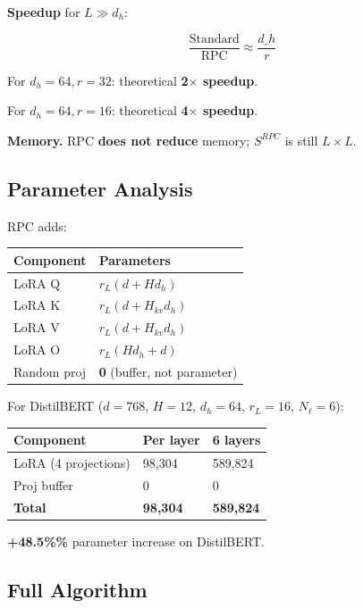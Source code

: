 \textbf{Speedup} for $L \gg d_h$:

\[
\frac{\text{Standard}}{\text{RPC}} \approx \frac{d\_h}{r}
\tag{4.6}
\]

For $d_h = 64, r = 32$: theoretical \textbf{2$\times$ speedup}.

For $d_h = 64, r = 16$: theoretical \textbf{4$\times$ speedup}.

\textbf{Memory.} RPC \textbf{does not reduce} memory; $S^{RPC}$ is still $L \times L$.

\subsection{Parameter Analysis}

RPC adds:

\begin{table}[H]
\centering
\small
\begin{tabular}{ll}
\toprule
\textbf{Component} & \textbf{Parameters} \\
\midrule
LoRA Q & $r_L(d + H d_h)$ \\
LoRA K & $r_L(d + H_{kv} d_h)$ \\
LoRA V & $r_L(d + H_{kv} d_h)$ \\
LoRA O & $r_L(H d_h + d)$ \\
Random proj & \textbf{0} (buffer, not parameter) \\
\bottomrule
\end{tabular}
\end{table}

For DistilBERT ($d = 768$, $H = 12$, $d_h = 64$, $r_L = 16$, $N_\ell = 6$):

\begin{table}[H]
\centering
\small
\begin{tabular}{lll}
\toprule
\textbf{Component} & \textbf{Per layer} & \textbf{6 layers} \\
\midrule
LoRA (4 projections) & 98,304 & 589,824 \\
Proj buffer & 0 & 0 \\
\textbf{Total} & \textbf{98,304} & \textbf{589,824} \\
\bottomrule
\end{tabular}
\end{table}

\textbf{+48.5\%\%} parameter increase on DistilBERT.

\subsection{Full Algorithm}

